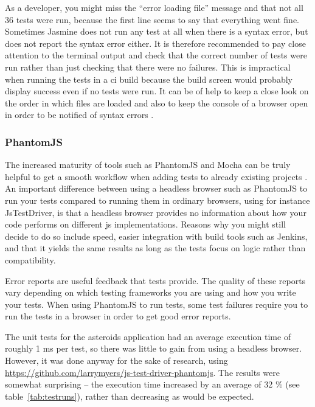 \documentclass[11pt]{article}
\begin{document}
As a developer, you might miss the ``error loading file'' message and that not all 36 tests were run, because the first line seems to say that everything went fine. Sometimes Jasmine does not run any test at all when there is a syntax error, but does not report the syntax error either. It is therefore recommended to pay close attention to the terminal output and check that the correct number of tests were run rather than just checking that there were no failures. This is impractical when running the tests in a \gls{ci} build because the build screen would probably display success even if no tests were run. It can be of help to keep a close look on the order in which files are loaded and also to keep the console of a browser open in order to be notified of syntax errors \cite{MikeJansen}.

\subsubsection{PhantomJS}

The increased maturity of tools such as PhantomJS and Mocha can be truly helpful to get a smooth workflow when adding tests to already existing projects \cite[questions~11-12 and 20]{Edelstam}. An important difference between using a headless browser such as PhantomJS to run your tests compared to running them in ordinary browsers, using for instance JsTestDriver, is that a headless browser provides no information about how your code performs on different \gls{js} implementations. Reasons why you might still decide to do so include speed, easier integration with build tools such as Jenkins, and that it yields the same results as long as the tests focus on logic rather than compatibility. \cite[questions~13-15]{Edelstam}

Error reports are useful feedback that tests provide. The quality of these reports vary depending on which testing frameworks you are using and how you write your tests. When using PhantomJS to run tests, some test failures require you to run the tests in a browser in order to get good error reports. \cite[question~12]{Edelstam}

The unit tests for the asteroids application had an average execution time of roughly 1 ms per test, so there was little to gain from using a headless browser. However, it was done anyway for the sake of research, using \url{https://github.com/larrymyers/js-test-driver-phantomjs}. The results were somewhat surprising -- the execution time increased by an average of 32 \% (see table~\ref{tab:testruns}), rather than decreasing as would be expected.
\end{document}
